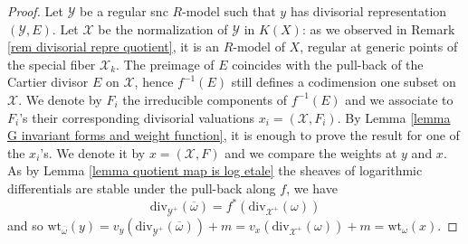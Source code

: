 \documentclass{amsart}%
\numberwithin{equation}{subsection}
\theoremstyle{plain2}
\theoremstyle{definition2}
\theoremstyle{stepstyle}
\theoremstyle{point}
\theoremstyle{subpoint}
\newcommand{\N}{\ensuremath{\mathbb{N}}}
\newcommand{\Z}{\ensuremath{\mathbb{Z}}}
\newcommand{\cX}{\ensuremath{\mathscr{X}}}
\newcommand{\caO}{\ensuremath{\mathcal{O}}}
\newcommand{\cY}{\ensuremath{\mathscr{Y}}}
\renewcommand{\cY}{\ensuremath{\mathscr{Y}}}
\newcommand{\Spec}{\ensuremath{\mathrm{Spec}\,}}
\newcommand{\divisor}{\mathrm{div}}
\newcommand{\weight}{\mathrm{wt}}
\begin{document}
\begin{proof}
Let $\cY$ be a regular snc $R$-model such that $y$ has divisorial representation $(\cY,E)$. Let $\cX$ be the normalization of $\cY$ in $K(X)$: as we observed in Remark \ref{rem divisorial repre quotient}, it is an $R$-model of $X$, regular at generic points of the special fiber $\cX_k$. The preimage of $E$ coincides with the pull-back of the Cartier divisor $E$ on $\cX$, hence $f^{-1}(E)$ still defines a codimension one subset on $\cX$. We denote by $F_i$ the irreducible components of $f^{-1}(E)$ and we associate to $F_i$'s their corresponding divisorial valuations $x_i=(\cX,F_i)$. By Lemma \ref{lemma G invariant forms and weight function}, it is enough to prove the result for one of the $x_i$'s. We denote it by $x = (\cX,F)$ and we compare the weights at $y$ and $x$. As by Lemma \ref{lemma quotient map is log etale} the sheaves of logarithmic differentials are stable under the pull-back along $f$, we have
$$\divisor_{\cY^+}(\overline{\omega})= f^*(\divisor_{\cX^+}(\omega))$$
and so $\weight_{\overline{\omega}}(y)= v_y(\divisor_{\cY^+}(\overline{\omega})) + m = v_{x}(\divisor_{\cX^+}(\omega))+ m= \weight_{\omega}(x)$.
%
\end{proof}
\end{document}
